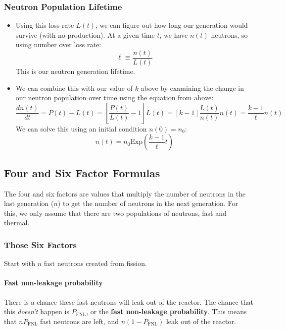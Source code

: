 \documentclass[letter]{article}
\begin{document}
\subsubsection{Neutron Population Lifetime}
\label{neutronPopLife}
\begin{itemize}
\item Using this loss rate $L(t)$, we can figure out how long our
  generation would survive (with no production). At a given time $t$,
  we have $n(t)$ neutrons, so using number over loss rate:
  \begin{equation*}
    \ell \equiv \frac{n(t)}{L(t)}
  \end{equation*}
This is our neutron generation lifetime.\cite[Lec 10.]{lecture}
\item We can combine this with our value of $k$ above by examining the
  change in our neutron population over time using the equation from above:
  \begin{equation*}
    \frac{dn(t)}{dt}=P(t)-L(t)=\left[\frac{P(t)}{L(t)}-1\right]L(t)=[k-1]\frac{L(t)}{n(t)}n(t)=\frac{k-1}{\ell}n(t)
  \end{equation*}
We can solve this using an initial condition $n(0)=n_0$:
\begin{equation*}
  n(t)=n_0\text{Exp}\left(\frac{k-1}{\ell}t\right)
\end{equation*}
\end{itemize}

\subsection{Four and Six Factor Formulas}
The four and six factors are values that multiply the number of
neutrons in the last generation ($n$) to get the number of neutrons in the
next generation. For this, we only assume that there are two
populations of neutrons, fast and thermal.

\subsubsection{Those Six Factors}

Start with $n$ fast neutrons created from fission.

\paragraph{Fast non-leakage probability}
There is a chance these fast neutrons will leak out of the
  reactor. The chance that this \textit{doesn't} happen is
  $P_{\text{FNL}}$, or the \textbf{fast non-leakage probability}. This
  means that $nP_{\text{FNL}}$ fast neutrons are left, and
  $n(1-P_{\text{FNL}})$ leak out of the reactor.
\end{document}
